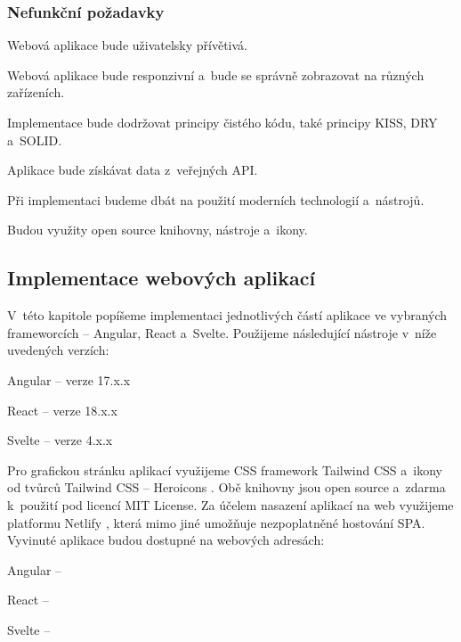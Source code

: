 \subsubsection{Nefunkční požadavky}

\begin{citemize}
	\item Webová aplikace bude uživatelsky přívětivá.
	\item Webová aplikace bude responzivní a~bude se správně zobrazovat na různých zařízeních.
	\item Implementace bude dodržovat principy čistého kódu, také principy KISS, DRY a~SOLID.
	\item Aplikace bude získávat data z~veřejných API.
	\item Při implementaci budeme dbát na použití moderních technologií a~nástrojů.
	\item Budou využity open source knihovny, nástroje a~ikony. 
\end{citemize}

\subsection{Implementace webových aplikací}

V~této kapitole popíšeme implementaci jednotlivých částí aplikace ve vybraných frameworcích -- Angular, React a~Svelte. Použijeme následující nástroje v~níže uvedených verzích:

\begin{citemize}
	\item Angular -- verze 17.x.x
	\item React -- verze 18.x.x
	\item Svelte -- verze 4.x.x
\end{citemize}

Pro grafickou stránku aplikací využijeme CSS framework Tailwind CSS \cite{tailwindcssframework} a~ikony od tvůrců Tailwind CSS -- Heroicons \cite{heroiconslib}. 
Obě knihovny jsou open source a~zdarma k~použití pod licencí MIT License. 
Za účelem nasazení aplikací na web využijeme platformu Netlify \cite{netlifyplatform}, která mimo jiné umožňuje nezpoplatněné hostování SPA. 
Vyvinuté aplikace budou dostupné na webových adresách:

\begin{citemize}
	\item Angular -- 
	\item React -- 
	\item Svelte -- 
\end{citemize}

